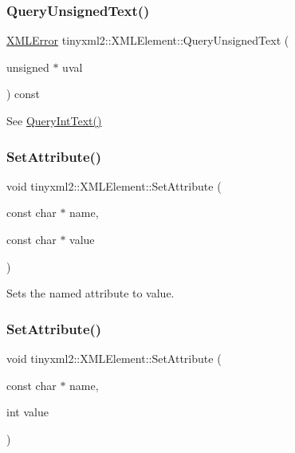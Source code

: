 \subsubsection{\texorpdfstring{Query\+Unsigned\+Text()}{QueryUnsignedText()}}
{\footnotesize\ttfamily \mbox{\hyperlink{namespacetinyxml2_a1fbf88509c3ac88c09117b1947414e08}{X\+M\+L\+Error}} tinyxml2\+::\+X\+M\+L\+Element\+::\+Query\+Unsigned\+Text (\begin{DoxyParamCaption}\item[{unsigned $\ast$}]{uval }\end{DoxyParamCaption}) const}



See \mbox{\hyperlink{classtinyxml2_1_1_x_m_l_element_a926357996bef633cb736e1a558419632}{Query\+Int\+Text()}} 

\mbox{\label{classtinyxml2_1_1_x_m_l_element_a11943abf2d0831548c3790dd5d9f119c}} 
\subsubsection{\texorpdfstring{Set\+Attribute()}{SetAttribute()}\hspace{0.1cm}{\footnotesize\ttfamily [1/7]}}
{\footnotesize\ttfamily void tinyxml2\+::\+X\+M\+L\+Element\+::\+Set\+Attribute (\begin{DoxyParamCaption}\item[{const char $\ast$}]{name,  }\item[{const char $\ast$}]{value }\end{DoxyParamCaption})\hspace{0.3cm}{\ttfamily [inline]}}



Sets the named attribute to value. 

\mbox{\label{classtinyxml2_1_1_x_m_l_element_aae6568c64c7f1cc88be8461ba41a79cf}} 
\subsubsection{\texorpdfstring{Set\+Attribute()}{SetAttribute()}\hspace{0.1cm}{\footnotesize\ttfamily [2/7]}}
{\footnotesize\ttfamily void tinyxml2\+::\+X\+M\+L\+Element\+::\+Set\+Attribute (\begin{DoxyParamCaption}\item[{const char $\ast$}]{name,  }\item[{int}]{value }\end{DoxyParamCaption})\hspace{0.3cm}{\ttfamily [inline]}}



